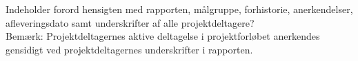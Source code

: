 Indeholder forord hensigten med rapporten, målgruppe, forhistorie, anerkendelser, afleveringsdato samt underskrifter af alle projektdeltagere?\\
Bemærk: Projektdeltagernes aktive deltagelse i projektforløbet anerkendes gensidigt ved projektdeltagernes underskrifter i rapporten. 